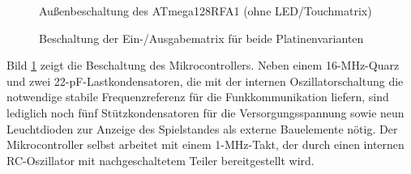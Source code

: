 \documentclass{clt2012}
\renewcommand{\figurename}{Bild}
\begin{document}
\begin{figure}[ht]
\centering %
\caption{Außenbeschaltung des \mbox{ATmega128RFA1} (ohne LED/Touchmatrix)}
\label{fig:uc_schem}
\end{figure}


\begin{figure}[hbt]
\centering %
\caption{Beschaltung der Ein-/Ausgabematrix für beide Platinenvarianten}
\label{fig:matrix}
\end{figure}

\figurename{} \ref{fig:uc_schem} zeigt die Beschaltung des Mikrocontrollers.
Neben einem 16-MHz-Quarz und zwei 22-pF-Lastkondensatoren, die mit der internen Oszillatorschaltung die notwendige stabile Frequenzreferenz für die Funkkommunikation liefern, sind lediglich noch fünf Stützkondensatoren für die Versorgungsspannung sowie neun Leuchtdioden zur Anzeige des Spielstandes als externe Bauelemente nötig.
Der Mikrocontroller selbst arbeitet mit einem 1-MHz-Takt, der durch einen internen RC-Oszillator mit nachgeschaltetem Teiler bereitgestellt wird.
\end{document}
